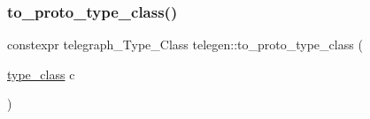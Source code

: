 \mbox{\label{namespacetelegen_a481dd47fb09859854721a748892d2a02}} 
\subsubsection{\texorpdfstring{to\+\_\+proto\+\_\+type\+\_\+class()}{to\_proto\_type\_class()}}
{\footnotesize\ttfamily constexpr telegraph\+\_\+\+Type\+\_\+\+Class telegen\+::to\+\_\+proto\+\_\+type\+\_\+class (\begin{DoxyParamCaption}\item[{\hyperlink{namespacetelegen_a72d4e69f0be1731e1a851a96dec858d8}{type\+\_\+class}}]{c }\end{DoxyParamCaption})}

